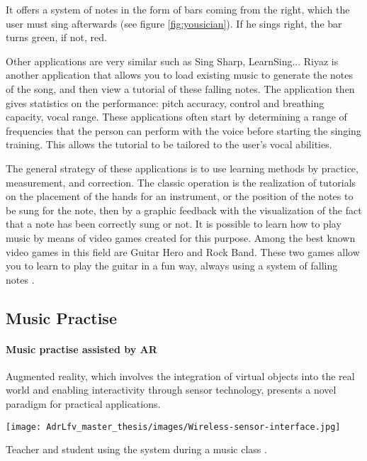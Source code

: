 It offers a system of notes in the form of bars coming from the right, which the user must sing afterwards (see figure \ref{fig:yousician}). If he sings right, the bar turns green, if not, red.

Other applications are very similar such as Sing Sharp, LearnSing... Riyaz is another application that allows you to load existing music to generate the notes of the song, and then view a tutorial of these falling notes.
The application then gives statistics on the performance: pitch accuracy, control and breathing capacity, vocal range. These applications often start by determining a range of frequencies that the person can perform with the voice before starting the singing training. This allows the tutorial to be tailored to the user’s vocal abilities.

The general strategy of these applications is to use learning methods by practice, measurement, and correction. The classic operation is the realization of tutorials on the placement of the hands for an instrument, or the position of the notes to be sung for the note, then by a graphic feedback with the visualization of the fact that a note has been correctly sung or not.
It is possible to learn how to play music by means of video games created for this purpose. Among the best known video games in this field are Guitar Hero and Rock Band. These two games allow you to learn to play the guitar in a fun way, always using a system of falling notes \cite{farrugia2015tunes}.

\subsection{Music Practise}

\paragraph{Music practise assisted by AR}

Augmented reality, which involves the integration of virtual objects into the real world and enabling interactivity through sensor technology, presents a novel paradigm for practical applications.

\begin{marginfigure}
    \centering
    \texttt{[image: AdrLfv\_master\_thesis/images/Wireless-sensor-interface.jpg]}
    \caption{Teacher and student using the system during a music class \cite{bevilacqua2007wireless}.}
    \label{fig:Wireless-sensor-interface}
\end{marginfigure}

